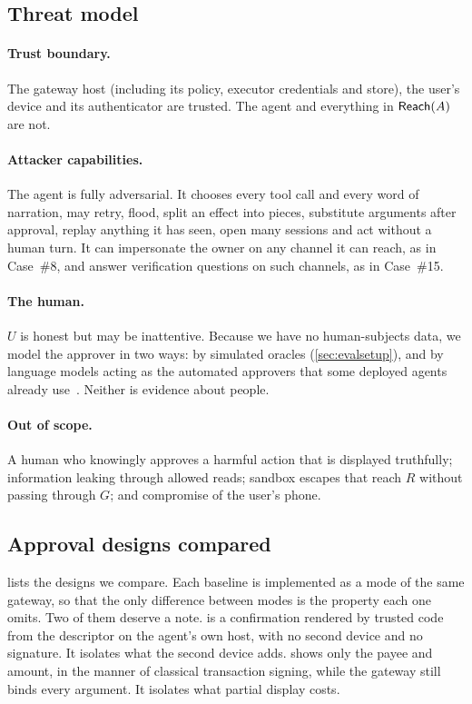 \subsection{Threat model}\label{sec:threat}

\paragraph{Trust boundary.} The gateway host (including its policy, executor credentials and store), the user's
device and its authenticator are trusted. The agent and everything in $\mathsf{Reach}(A)$ are not.

\paragraph{Attacker capabilities.} The agent is fully adversarial. It chooses every tool call and every word of
narration, may retry, flood, split an effect into pieces, substitute arguments after approval, replay anything it
has seen, open many sessions and act without a human turn. It can impersonate the owner on any channel it can
reach, as in Case~\#8, and answer verification questions on such channels, as in Case~\#15.

\paragraph{The human.} $U$ is honest but may be inattentive. Because we have no human-subjects data, we model the
approver in two ways: by simulated oracles (\cref{sec:evalsetup}), and by language models acting as the
automated approvers that some deployed agents already use~\citep{anthropic2026automode}. Neither is evidence about people.

\paragraph{Out of scope.} A human who knowingly approves a harmful action that is displayed truthfully;
information leaking through allowed reads; sandbox escapes that reach $R$ without passing through $G$; and
compromise of the user's phone.

\subsection{Approval designs compared}\label{sec:modes}

 lists the designs we compare. Each baseline is implemented as a mode of the same gateway, so that
the only difference between modes is the property each one omits. Two of them deserve a note.
 is a confirmation rendered by trusted code from the descriptor on the agent's own host, with
no second device and no signature. It isolates what the second device adds.  shows only the payee
and amount, in the manner of classical transaction signing, while the gateway still binds every argument. It
isolates what partial display costs.

